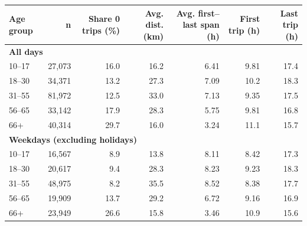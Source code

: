 \begin{tabular}{l r r r r r r}
\toprule
\textbf{Age group} &
\textbf{n} &
\textbf{Share 0 trips (\%)} &
\textbf{Avg. dist. (km)} &
\textbf{Avg. first--last span (h)} &
\textbf{First trip (h)} &
\textbf{Last trip (h)} \\
\midrule
\multicolumn{7}{l}{\textbf{All days}} \\
10--17 & 27,073 & 16.0 & 16.2 & 6.41 & 9.81 & 17.4 \\
18--30 & 34,371 & 13.2 & 27.3 & 7.09 & 10.2 & 18.3 \\
31--55 & 81,972 & 12.5 & 33.0 & 7.13 & 9.35 & 17.5 \\
56--65 & 33,142 & 17.9 & 28.3 & 5.75 & 9.81 & 16.8 \\
66+ & 40,314 & 29.7 & 16.0 & 3.24 & 11.1 & 15.7 \\
\midrule
\multicolumn{7}{l}{\textbf{Weekdays (excluding holidays)}} \\
10--17 & 16,567 & 8.9 & 13.8 & 8.11 & 8.42 & 17.3 \\
18--30 & 20,617 & 9.4 & 28.3 & 8.23 & 9.23 & 18.3 \\
31--55 & 48,975 & 8.2 & 35.5 & 8.52 & 8.38 & 17.7 \\
56--65 & 19,909 & 13.7 & 29.2 & 6.72 & 9.16 & 16.9 \\
66+ & 23,949 & 26.6 & 15.8 & 3.46 & 10.9 & 15.6 \\
\bottomrule
\end{tabular}
